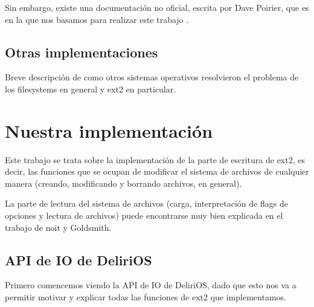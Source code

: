 Sin embargo, existe una documentación no oficial, escrita por Dave Poirier, que es en la que nos basamos para realizar este trabajo \cite{ext2doc}.

\subsection{Otras implementaciones}
\begin{puntos}
  \item Breve descripción de como otros sistemas operativos resolvieron el problema de los filesystems en general y ext2 en particular.
\end{puntos}



\newpage
\section{Nuestra implementación}

Este trabajo se trata sobre la implementación de la parte de escritura de ext2, es decir, las funciones que se ocupan de modificar el sistema de archivos de cualquier manera (creando, modificando y borrando archivos, en general). 

La parte de lectura del sistema de archivos (carga, interpretación de flags de opciones y lectura de archivos) puede encontrarse muy bien explicada en el trabajo de noit y Goldsmith.

\subsection{API de IO de DeliriOS}

Primero comencemos viendo la API de IO de DeliriOS, dado que esto nos va a permitir motivar y explicar todas las funciones de ext2 que implementamos.

